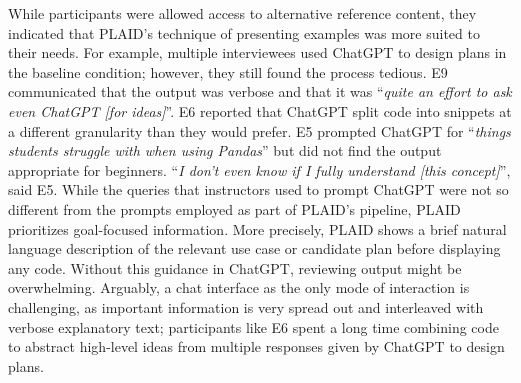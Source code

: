 While participants were allowed access to alternative reference content, they indicated that PLAID's technique of presenting examples was more suited to their needs. For example, multiple interviewees used ChatGPT to design plans in the baseline condition; however, they still found the process tedious. E9 communicated that the output was verbose and that it was ``\textit{quite an effort to ask even ChatGPT [for ideas]}''. E6 reported that ChatGPT split code into snippets at a different granularity than they would prefer. E5 prompted ChatGPT for ``\textit{things students struggle with when using Pandas}'' but did not find the output appropriate for beginners. ``\textit{I don't even know if I fully understand [this concept]}'', said E5.
While the queries that instructors used to prompt ChatGPT were not so different from the prompts employed as part of PLAID's pipeline,
PLAID prioritizes goal-focused information. More precisely, PLAID shows a brief natural language description of the relevant use case or candidate plan before displaying any code. Without this guidance in ChatGPT, reviewing output might be overwhelming.
Arguably, a chat interface as the only mode of interaction is challenging, as important information is very spread out and interleaved with verbose explanatory text; participants like E6 spent a long time combining code to abstract high-level ideas from multiple responses given by ChatGPT to design plans.


